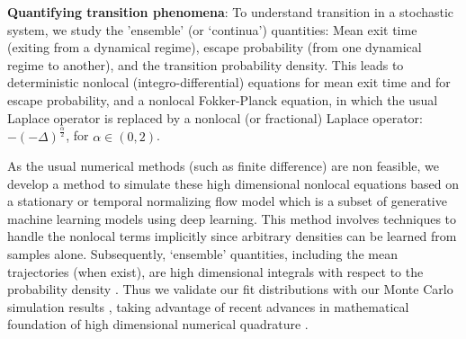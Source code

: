\documentclass[11pt]{article}
\begin{document}

 
 \textbf{Quantifying transition phenomena}:
To understand transition   in    a stochastic system, we  
  study the     'ensemble' (or `continua') quantities: Mean exit time (exiting from a dynamical regime),   escape probability (from one dynamical regime to another),    and  the transition  probability density.
This leads to deterministic  nonlocal (integro-differential) equations for mean exit time and for escape probability, and a nonlocal Fokker-Planck equation,
in which the usual Laplace operator is replaced
by a nonlocal (or fractional) Laplace operator:  $-(-\Delta)^{\frac{\alpha}2  }$, for $\alpha \in (0, 2)$.
 
  
As the usual numerical methods (such as finite difference) are non feasible, we develop a method to simulate these high dimensional nonlocal equations based on a stationary or temporal normalizing flow model which is a subset of generative machine learning models using deep learning. This method involves techniques to handle the nonlocal terms implicitly since arbitrary densities can be learned from samples alone. Subsequently, `ensemble' quantities, including the mean trajectories (when exist), are high dimensional integrals with respect to the probability density \cite{DuanBook2015}.  Thus we validate our fit distributions with our Monte Carlo simulation results \cite{MCQMC2020QMCPyTut, QMCPyTutColab2020}, taking advantage of recent advances in mathematical foundation of high dimensional numerical quadrature \cite{HicEtal17a}. 
\end{document}
